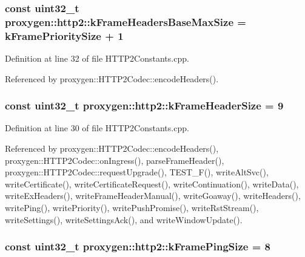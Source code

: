 \subsubsection[{k\+Frame\+Headers\+Base\+Max\+Size}]{\setlength{\rightskip}{0pt plus 5cm}const uint32\+\_\+t proxygen\+::http2\+::k\+Frame\+Headers\+Base\+Max\+Size = {\bf k\+Frame\+Priority\+Size} + 1}\label{namespaceproxygen_1_1http2_ab055361fdbbd871775c4d544f5d10ccf}


Definition at line 32 of file H\+T\+T\+P2\+Constants.\+cpp.



Referenced by proxygen\+::\+H\+T\+T\+P2\+Codec\+::encode\+Headers().

\subsubsection[{k\+Frame\+Header\+Size}]{\setlength{\rightskip}{0pt plus 5cm}const uint32\+\_\+t proxygen\+::http2\+::k\+Frame\+Header\+Size = 9}\label{namespaceproxygen_1_1http2_a4035b862543c0ca5ff3709556c49086d}


Definition at line 30 of file H\+T\+T\+P2\+Constants.\+cpp.



Referenced by proxygen\+::\+H\+T\+T\+P2\+Codec\+::encode\+Headers(), proxygen\+::\+H\+T\+T\+P2\+Codec\+::on\+Ingress(), parse\+Frame\+Header(), proxygen\+::\+H\+T\+T\+P2\+Codec\+::request\+Upgrade(), T\+E\+S\+T\+\_\+\+F(), write\+Alt\+Svc(), write\+Certificate(), write\+Certificate\+Request(), write\+Continuation(), write\+Data(), write\+Ex\+Headers(), write\+Frame\+Header\+Manual(), write\+Goaway(), write\+Headers(), write\+Ping(), write\+Priority(), write\+Push\+Promise(), write\+Rst\+Stream(), write\+Settings(), write\+Settings\+Ack(), and write\+Window\+Update().

\subsubsection[{k\+Frame\+Ping\+Size}]{\setlength{\rightskip}{0pt plus 5cm}const uint32\+\_\+t proxygen\+::http2\+::k\+Frame\+Ping\+Size = 8}\label{namespaceproxygen_1_1http2_a41214eb777cae66877cdcc04add9ff0f}



